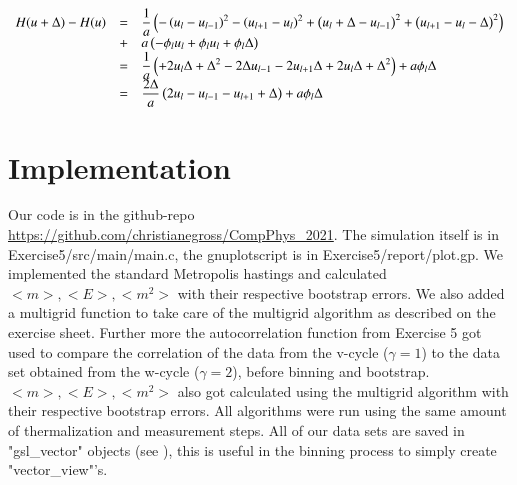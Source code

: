 \documentclass{scrartcl}
\begin{document}
\[\begin{array}{>{\displaystyle}r>{\displaystyle}c>{\displaystyle}l}
H(u+\Delta)-H(u)&=&\frac{1}{a}\left( -\left(u_l-u_{l-1} \right)^2-\left(u_{l+1}-u_{l}  \right)^2+\left(u_l+\Delta-u_{l-1}  \right)^2+\left( u_{l+1}-u_{l}-\Delta \right)^2\right) \\&+&a\left( -\phi_lu_l+\phi_lu_l+\phi_l\Delta\right) \\



&=&\frac{1}{a}\left(+2u_l\Delta+\Delta^2-2\Delta u_{l-1}-2u_{l+1}\Delta+2u_l\Delta+\Delta^2 \right) +a\phi_l\Delta \\

&=&\frac{2\Delta}{a}\left(2u_l-u_{l-1}-u_{l+1}+\Delta \right)+ a\phi_l\Delta

\end{array}\]

\section{Implementation}
Our code is in the github-repo \url{https://github.com/christianegross/CompPhys\_2021}. The simulation itself is in Exercise5/src/main/main.c, the gnuplotscript is in Exercise5/report/plot.gp. 
We implemented the standard Metropolis hastings and calculated $<m>, <E>, <m^2>$ with their respective bootstrap errors. We also added a multigrid function to take care of the multigrid algorithm as described on the exercise sheet. Further more the autocorrelation function from Exercise 5 got used to compare the correlation of the data from the v-cycle ($\gamma=1$) to the data set obtained from the w-cycle ($\gamma=2$), before binning and bootstrap. $<m>, <E>, <m^2>$ also got calculated using the multigrid algorithm with their respective bootstrap errors.
All algorithms were run using the same amount of thermalization and measurement steps.
All of our data sets are saved in "gsl\_vector" objects (see \cite{gsldoc_mat}), this is useful in the binning process to simply create "vector\_view"'s. 
\end{document}
